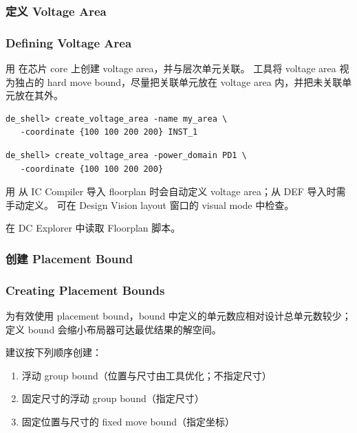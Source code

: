 \subsubsection{定义 Voltage Area}
\subsubsection*{Defining Voltage Area}

用  在芯片 core 上创建 voltage area，并与层次单元关联。
工具将 voltage area 视为独占的 hard move bound，尽量把关联单元放在 voltage area 内，并把未关联单元放在其外。

\begin{lstlisting}[caption={约束实例到 voltage area}]
de_shell> create_voltage_area -name my_area \
   -coordinate {100 100 200 200} INST_1
\end{lstlisting}

\begin{lstlisting}[caption={约束电源域单元到 voltage area}]
de_shell> create_voltage_area -power_domain PD1 \
   -coordinate {100 100 200 200}
\end{lstlisting}

用  从 IC Compiler 导入 floorplan 时会自动定义 voltage area；从 DEF 导入时需手动定义。
可在 Design Vision layout 窗口的 visual mode 中检查。

\begin{seeAlsoBox}
在 DC Explorer 中读取 Floorplan 脚本。
\end{seeAlsoBox}

\subsubsection{创建 Placement Bound}
\subsubsection*{Creating Placement Bounds}

为有效使用 placement bound，bound 中定义的单元数应相对设计总单元数较少；定义 bound 会缩小布局器可达最优结果的解空间。

建议按下列顺序创建：
\begin{enumerate}
  \item 浮动 group bound（位置与尺寸由工具优化；不指定尺寸）
  \item 固定尺寸的浮动 group bound（指定尺寸）
  \item 固定位置与尺寸的 fixed move bound（指定坐标）
\end{enumerate}

